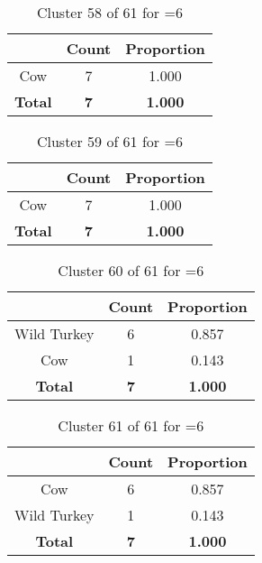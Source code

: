 \begin{table}[ht!]
\centering
\begin{tabular}{|c|c|c|}
\hline
\bf \Spec{} &\bf Count &\bf Proportion\\ \hline \hline
Cow & 7 & 1.000\\ \hline
\hline
\bf Total & \bf 7 & \bf 1.000\\ \hline
\end{tabular}
\label{tab:cluster:58:6}
\caption{Cluster 58 of 61 for \minneigh{}=6}
\end{table}

\begin{table}[ht!]
\centering
\begin{tabular}{|c|c|c|}
\hline
\bf \Spec{} &\bf Count &\bf Proportion\\ \hline \hline
Cow & 7 & 1.000\\ \hline
\hline
\bf Total & \bf 7 & \bf 1.000\\ \hline
\end{tabular}
\label{tab:cluster:59:6}
\caption{Cluster 59 of 61 for \minneigh{}=6}
\end{table}

\clearpage
\begin{table}[ht!]
\centering
\begin{tabular}{|c|c|c|}
\hline
\bf \Spec{} &\bf Count &\bf Proportion\\ \hline \hline
Wild Turkey & 6 & 0.857\\ \hline
Cow & 1 & 0.143\\ \hline
\hline
\bf Total & \bf 7 & \bf 1.000\\ \hline
\end{tabular}
\label{tab:cluster:60:6}
\caption{Cluster 60 of 61 for \minneigh{}=6}
\end{table}

\begin{table}[ht!]
\centering
\begin{tabular}{|c|c|c|}
\hline
\bf \Spec{} &\bf Count &\bf Proportion\\ \hline \hline
Cow & 6 & 0.857\\ \hline
Wild Turkey & 1 & 0.143\\ \hline
\hline
\bf Total & \bf 7 & \bf 1.000\\ \hline
\end{tabular}
\label{tab:cluster:61:6}
\caption{Cluster 61 of 61 for \minneigh{}=6}
\end{table}

